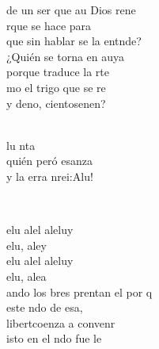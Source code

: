 \documentclass[12pt]{article}
\begin{document}
\begin{multicols*}{2}
\begin{cancion}
            de un ser que au Dios rene\\
            rque se hace para \\
            que sin hablar se la entnde?\\
        \jump
            ¿Quién se torna en auya\\
            porque traduce la rte\\
            mo el trigo que se re \\
            y deno, cientosenen?\\\jump\\
            \begin{chorus}%
            lu nta \\
            quién peró esanza\\
            y la erra nrei:Alu!\\
            \end{chorus}%
            \jump\\
        \end{cancion}%
        
        \begin{cancion}%
            elu  alel aleluy\\
            elu, aley\\
            elu  alel aleluy\\
            elu, alea\\
        \jump
            ando los bres prentan el por q \\
             este ndo de esa,\\
             libertcoenza a convenr\\
            isto en el ndo fue le\\
        \end{cancion}%
        

\end{multicols*}
\end{document}
